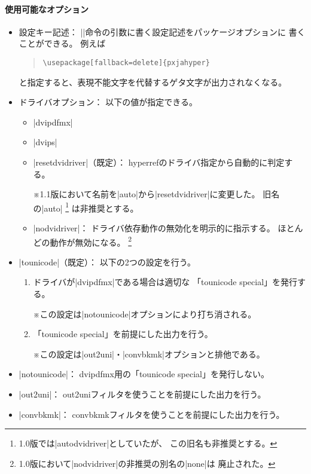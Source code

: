 \documentclass[uplatex,dvipdfmx,a4paper]{jsarticle}
\renewcommand{\headfont}{\gtfamily\romanseries{sbc}\sffamily}
\newcommand{\Pkg}[1]{\textsf{#1}}
\newcommand{\Note}{\par\noindent ※}
\newcommand{\Means}{：\quad}
\providecommand{\Strong}[1]{{\headfont#1}}
\begin{document}
\paragraph{使用可能なオプション}\mbox{}
\begin{itemize}
\item \Strong{設定キー記述}\Means
  |\pxjahypersetup|命令の引数に書く設定記述をパッケージオプションに
  書くことができる。
  例えば
\begin{quote}\small\begin{verbatim}
\usepackage[fallback=delete]{pxjahyper}
\end{verbatim}\end{quote}
  と指定すると、表現不能文字を代替するゲタ文字が出力されなくなる。
\item \Strong{ドライバオプション}\Means
  以下の値が指定できる。
  \begin{itemize}
  \item |dvipdfmx|
  \item |dvips|
  \item |resetdvidriver|（既定）\Means
    \Pkg{hyperref}のドライバ指定から自動的に判定する。
    \Note 1.1版において名前を|auto|から|resetdvidriver|に変更した。
      旧名の|auto|%
      \footnote{1.0版では|autodvidriver|としていたが、
        この旧名も\Strong{非推奨}とする。}%
      は\Strong{非推奨}とする。
  \item |nodvidriver|\Means
    ドライバ依存動作の無効化を明示的に指示する。
    ほとんどの動作が無効になる。
    \footnote{1.0版において|nodvidriver|の非推奨の別名の|none|は
      \Strong{廃止}された。}
  \end{itemize}
\item |tounicode|（既定）\Means
  以下の2つの設定を行う。
  \begin{enumerate}
  \item ドライバが|dvipdfmx|である場合は適切な
    「tounicode special」を発行する。
    \Note この設定は|notounicode|オプションにより打ち消される。
  \item 「tounicode special」を前提にした出力を行う。
    \Note この設定は|out2uni|・|convbkmk|オプションと排他である。
  \end{enumerate}
\item |notounicode|\Means
  dvipdfmx用の「tounicode special」を発行しない。
\item |out2uni|\Means
  out2uniフィルタを使うことを前提にした出力を行う。
\item |convbkmk|\Means
  convbkmkフィルタを使うことを前提にした出力を行う。

\end{itemize}
\end{document}
